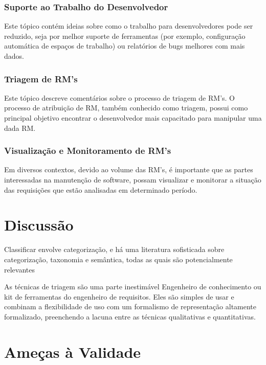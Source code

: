 \subsubsection{Suporte ao Trabalho do Desenvolvedor}

Este tópico contém ideias sobre como o trabalho para desenvolvedores pode ser
reduzido, seja por melhor suporte de ferramentas (por exemplo, configuração
automática de espaços de trabalho) ou relatórios de bugs melhores com mais
dados.

\subsubsection{Triagem de RM's}

Este tópico descreve comentários sobre o processo de triagem de RM's. O processo
de atribuição de RM, também conhecido como triagem, possui como principal
objetivo encontrar o desenvolvedor mais capacitado para manipular uma dada RM. 

\subsubsection{Visualização e Monitoramento de RM's}

Em diversos contextos, devido ao volume das RM's, é importante que as partes
interessadas na manutenção de software, possam visualizar e monitorar a situação
das requisições que estão analisadas em determinado período.

\section{Discussão}
\label{sec:discussao}

Classificar envolve categorização, e há uma literatura sofisticada sobre
categorização, taxonomia e semântica, todas as quais são potencialmente
relevantes~\cite{rugg2005sorting}

As técnicas de triagem são uma parte inestimável Engenheiro de conhecimento ou
kit de ferramentas do engenheiro de requisitos.  Eles são simples de usar e
combinam a flexibilidade de uso com um formalismo de representação altamente
formalizado, preenchendo a lacuna entre as técnicas qualitativas e
quantitativas.

\section{Ameças à Validade}
\label{sec:ameacas_a_validade}

